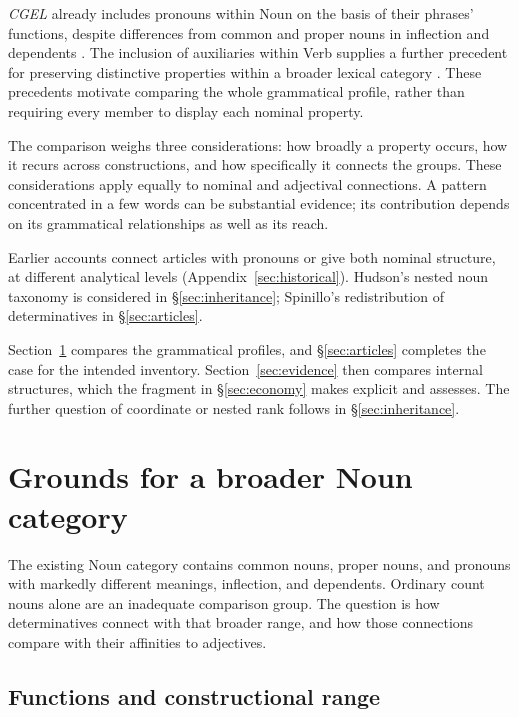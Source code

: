 \documentclass[12pt]{article}
\begin{document}
\textit{CGEL} already includes pronouns within Noun on the basis of their phrases' functions, despite differences from common and proper nouns in inflection and dependents \citep[327--328]{huddleston2002}. The inclusion of auxiliaries within Verb supplies a further precedent for preserving distinctive properties within a broader lexical category \citep{pullumwilson1977}. These precedents motivate comparing the whole grammatical profile, rather than requiring every member to display each nominal property.

The comparison weighs three considerations: how broadly a property occurs, how it recurs across constructions, and how specifically it connects the groups. These considerations apply equally to nominal and adjectival connections. A pattern concentrated in a few words can be substantial evidence; its contribution depends on its grammatical relationships as well as its reach.

Earlier accounts connect articles with pronouns or give both nominal structure, at different analytical levels (Appendix~\ref{sec:historical}). Hudson's nested noun taxonomy is considered in §\ref{sec:inheritance}; Spinillo's redistribution of determinatives in §\ref{sec:articles}.

Section~\ref{sec:proposal} compares the grammatical profiles, and §\ref{sec:articles} completes the case for the intended inventory. Section~\ref{sec:evidence} then compares internal structures, which the fragment in §\ref{sec:economy} makes explicit and assesses. The further question of coordinate or nested rank follows in §\ref{sec:inheritance}.

\section{Grounds for a broader Noun category}\label{sec:proposal}

The existing Noun category contains common nouns, proper nouns, and pronouns with markedly different meanings, inflection, and dependents. Ordinary count nouns alone are an inadequate comparison group. The question is how determinatives connect with that broader range, and how those connections compare with their affinities to adjectives.

\subsection{Functions and constructional range}\label{sec:independent}
\end{document}
